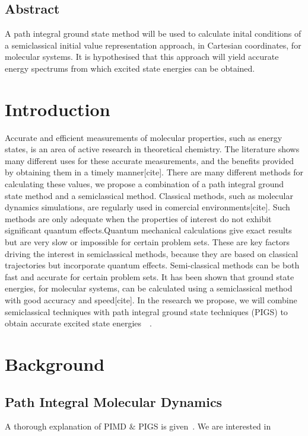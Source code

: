 

\subsection*{Abstract}
A path integral ground state method will be used to calculate inital conditions of a semiclassical initial value representation approach, in Cartesian coordinates, 
for molecular systems. It is hypothesised that this approach will yield accurate energy spectrums from which excited state energies can be obtained. 


\section{Introduction}
Accurate and efficient measurements of molecular properties, such as energy states, is an area of active research in theoretical chemistry. The literature shows many different uses for these accurate measurements, and the benefits provided by obtaining them in a timely manner[cite]. There are many different methods for calculating these values, we propose a combination of a path integral ground state method and a semiclassical method. Classical methods, such as molecular dynamics simulations, are regularly used in comercial environments[cite]. Such methods are only adequate when the properties of interest do not exhibit significant quantum effects.Quantum mechanical calculations give exact results but are very slow or impossible for certain problem sets. These are key factors driving the interest in semiclassical methods, because they are based on classical trajectories but incorporate quantum effects. Semi-classical methods can be both fast and accurate for certain problem sets. It has been shown that ground state energies, for molecular systems, can be calculated using a semiclassical method with good accuracy and speed[cite]. In the research we propose, we will combine semiclassical techniques with path integral ground state techniques (PIGS) to obtain accurate excited state energies~\cite{issack2007semiclassical}~\cite{schmidt2014inclusion}.

\section{Background}

\subsection*{Path Integral Molecular Dynamics}
A thorough explanation of PIMD $\&$ PIGS is given~\cite{iouchtchenko2014particle}. We are interested in 



